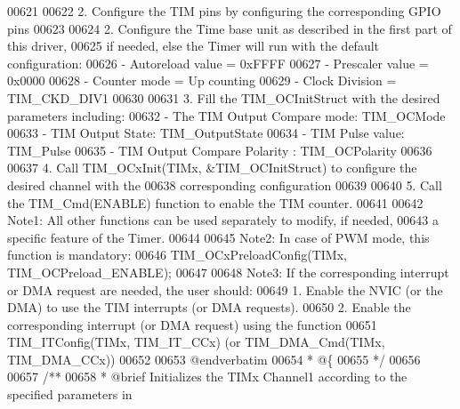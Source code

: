\begin{DoxyCode}
00621 \textcolor{comment}{       }
00622 \textcolor{comment}{       2. Configure the TIM pins by configuring the corresponding GPIO pins}
00623 \textcolor{comment}{       }
00624 \textcolor{comment}{       2. Configure the Time base unit as described in the first part of this driver, }
00625 \textcolor{comment}{          if needed, else the Timer will run with the default configuration:}
00626 \textcolor{comment}{          - Autoreload value = 0xFFFF}
00627 \textcolor{comment}{          - Prescaler value = 0x0000}
00628 \textcolor{comment}{          - Counter mode = Up counting}
00629 \textcolor{comment}{          - Clock Division = TIM\_CKD\_DIV1}
00630 \textcolor{comment}{          }
00631 \textcolor{comment}{       3. Fill the TIM\_OCInitStruct with the desired parameters including:}
00632 \textcolor{comment}{          - The TIM Output Compare mode: TIM\_OCMode}
00633 \textcolor{comment}{          - TIM Output State: TIM\_OutputState}
00634 \textcolor{comment}{          - TIM Pulse value: TIM\_Pulse}
00635 \textcolor{comment}{          - TIM Output Compare Polarity : TIM\_OCPolarity}
00636 \textcolor{comment}{       }
00637 \textcolor{comment}{       4. Call TIM\_OCxInit(TIMx, &TIM\_OCInitStruct) to configure the desired channel with the }
00638 \textcolor{comment}{          corresponding configuration}
00639 \textcolor{comment}{       }
00640 \textcolor{comment}{       5. Call the TIM\_Cmd(ENABLE) function to enable the TIM counter.}
00641 \textcolor{comment}{       }
00642 \textcolor{comment}{       Note1: All other functions can be used separately to modify, if needed,}
00643 \textcolor{comment}{              a specific feature of the Timer. }
00644 \textcolor{comment}{          }
00645 \textcolor{comment}{       Note2: In case of PWM mode, this function is mandatory:}
00646 \textcolor{comment}{              TIM\_OCxPreloadConfig(TIMx, TIM\_OCPreload\_ENABLE); }
00647 \textcolor{comment}{              }
00648 \textcolor{comment}{       Note3: If the corresponding interrupt or DMA request are needed, the user should:}
00649 \textcolor{comment}{                1. Enable the NVIC (or the DMA) to use the TIM interrupts (or DMA requests). }
00650 \textcolor{comment}{                2. Enable the corresponding interrupt (or DMA request) using the function }
00651 \textcolor{comment}{                   TIM\_ITConfig(TIMx, TIM\_IT\_CCx) (or TIM\_DMA\_Cmd(TIMx, TIM\_DMA\_CCx))   }
00652 \textcolor{comment}{}
00653 \textcolor{comment}{@endverbatim}
00654 \textcolor{comment}{  * @\{}
00655 \textcolor{comment}{  */}
00656 
00657 \textcolor{comment}{/**}
00658 \textcolor{comment}{  * @brief  Initializes the TIMx Channel1 according to the specified parameters in}

\end{DoxyCode}
